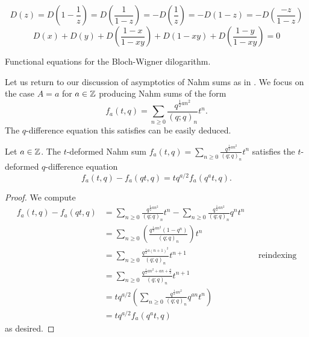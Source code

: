 \begin{table}[h]\label{table: BW dilogarithm functional equations}
    \begin{equation}\label{eqn: BW dilogarithm sixfold}
        D(z)=D\left(1-\frac{1}{z}\right)=D\left(\frac{1}{1-z}\right)=-D\left(\frac{1}{z}\right)=-D(1-z)=-D\left(\frac{-z}{1-z}\right)
    \end{equation}
    \begin{equation}\label{eqn: BW dilogarithm five term relation}
        D(x)+D(y)+D\left(\frac{1-x}{1-xy}\right)+D(1-xy)+D\left(\frac{1-y}{1-xy}\right)=0
    \end{equation}
    \caption{Functional equations for the Bloch-Wigner dilogarithm.}
\end{table}
Let us return to our discussion of asymptotics of Nahm sums as in . We focus on the case $A=a$ for $a\in\mathbb{Z}$ producing Nahm sums of the form 
$$f_{a}(t,q)=\sum_{n\geq0}\frac{q^{\frac{1}{2}an^{2}}}{(q;q)_{n}}t^{n}.$$
The $q$-difference equation this satisfies can be easily deduced. 
\begin{proposition}\label{prop: q-difference equation of 1x1 Nahm sum}
    Let $a\in\mathbb{Z}$. The $t$-deformed Nahm sum $f_{a}(t,q)=\sum_{n\geq0}\frac{q^{\frac{1}{2}an^{2}}}{(q;q)_{n}}t^{n}$ satisfies the $t$-deformed $q$-difference equation 
    \begin{equation}\label{eqn: q-difference equation of 1x1 Nahm sum}
        f_{a}(t,q) - f_{a}(qt,q)=tq^{a/2}f_{a}(q^{a}t,q).
    \end{equation}
\end{proposition}
\begin{proof}
    We compute 
    \begin{align*}
        f_{a}(t,q) - f_{a}(qt,q) &= \sum_{n\geq0}\frac{q^{\frac{1}{2}an^{2}}}{(q;q)_{n}}t^{n} - \sum_{n\geq0}\frac{q^{\frac{1}{2}an^{2}}}{(q;q)_{n}}q^{n}t^{n} \\
        &= \sum_{n\geq0}\left(\frac{q^{\frac{1}{2}an^{2}}(1-q^{n})}{(q;q)_{n}}\right)t^{n} \\
        &= \sum_{n\geq0}\frac{q^{\frac{1}{2}a(n+1)^{2}}}{(q;q)_{n}}t^{n+1} && \text{reindexing}\\
        &= \sum_{n\geq0}\frac{q^{\frac{1}{2}an^{2}+an+\frac{a}{2}}}{(q;q)_{n}}t^{n+1}\\
        &= tq^{a/2}\left(\sum_{n\geq0}\frac{q^{\frac{1}{2}an^{2}}}{(q;q)_{n}}q^{an}t^{n}\right)\\
        &= tq^{a/2}f_{a}(q^{a}t,q)
    \end{align*}
    as desired. 
\end{proof}
